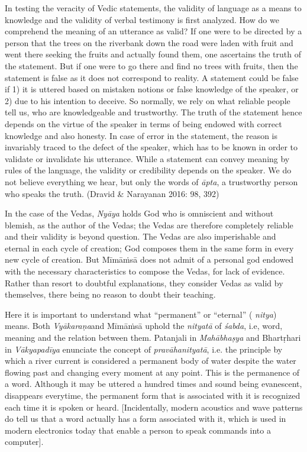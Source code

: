In testing the veracity of Vedic statements, the validity of language as a means to knowledge and the validity of verbal testimony is first analyzed. How do we comprehend the meaning of an utterance as valid? If one were to be directed by a person that the trees on the riverbank down the road were laden with fruit and went there seeking the fruits and actually found them, one ascertains the truth of the statement. But if one were to go there and find no trees with fruits, then the statement is false as it does not correspond to reality. A statement could be false if 1) it is uttered based on mistaken notions or false knowledge of the speaker, or 2) due to his intention to deceive. So normally, we rely on what reliable people tell us, who are knowledgeable and trustworthy. The truth of the statement hence depends on the virtue of the speaker in terms of being endowed with correct knowledge and also honesty. In case of error in the statement, the reason is invariably traced to the defect of the speaker, which has to be known in order to validate or invalidate his utterance. While a statement can convey meaning by rules of the language, the validity or credibility depends on the speaker. We do not believe everything we hear, but only the words of \textit{āpta}, a trustworthy person who speaks the truth. (Dravid \& Narayanan 2016: 98, 392)

In the case of the Vedas, \textit{Nyāya} holds God who is omniscient and without blemish, as the author of the Vedas; the Vedas are therefore completely reliable and their validity is beyond question. The Vedas are also imperishable and eternal in each cycle of creation; God composes them in the same form in every new cycle of creation. But Mīmāṁsā does not admit of a personal god endowed with the necessary characteristics to compose the Vedas, for lack of evidence. Rather than resort to doubtful explanations, they consider Vedas as valid by themselves, there being no reason to doubt their teaching.

Here it is important to understand what “permanent” or “eternal” ( \textit{nitya}) means. Both \textit{Vyākaraṇa}and Mīmāṁsā uphold the \textit{nityatā} of \textit{śabda}, i.e, word, meaning and the relation between them. Patanjali in \textit{Mahābhaṣya} and Bhartṛhari in \textit{Vākyapadīya} enunciate the concept of \textit{pravāhanityatā}, i.e. the principle by which a river current is considered a permanent body of water despite the water flowing past and changing every moment at any point. This is the permanence of a word. Although it may be uttered a hundred times and sound being evanescent, disappears everytime, the permanent form that is associated with it is recognized each time it is spoken or heard. [Incidentally, modern acoustics and wave patterns do tell us that a word actually has a form associated with it, which is used in modern electronics today that enable a person to speak commands into a computer].

